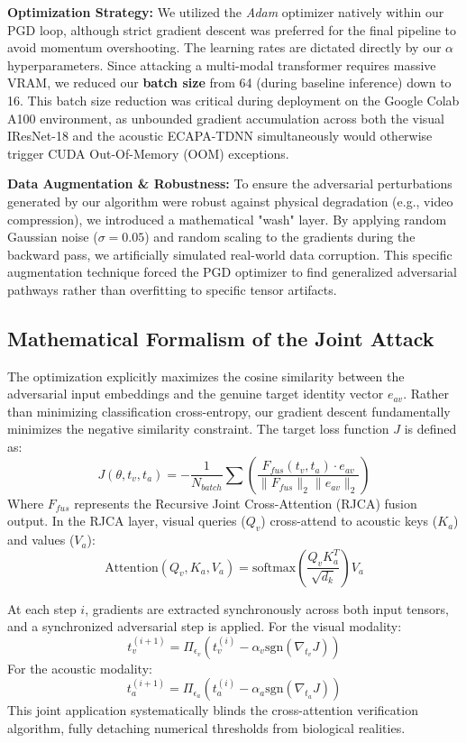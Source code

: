 \documentclass[conference]{IEEEtran}
\begin{document}
\textbf{Optimization Strategy:} We utilized the \textit{Adam} optimizer natively within our PGD loop, although strict gradient descent was preferred for the final pipeline to avoid momentum overshooting. The learning rates are dictated directly by our $\alpha$ hyperparameters. Since attacking a multi-modal transformer requires massive VRAM, we reduced our \textbf{batch size} from 64 (during baseline inference) down to 16. This batch size reduction was critical during deployment on the Google Colab A100 environment, as unbounded gradient accumulation across both the visual IResNet-18 and the acoustic ECAPA-TDNN simultaneously would otherwise trigger CUDA Out-Of-Memory (OOM) exceptions.

\textbf{Data Augmentation \& Robustness:} To ensure the adversarial perturbations generated by our algorithm were robust against physical degradation (e.g., video compression), we introduced a mathematical "wash" layer. By applying random Gaussian noise ($\sigma = 0.05$) and random scaling to the gradients during the backward pass, we artificially simulated real-world data corruption. This specific augmentation technique forced the PGD optimizer to find generalized adversarial pathways rather than overfitting to specific tensor artifacts.

\subsection{Mathematical Formalism of the Joint Attack}
The optimization explicitly maximizes the cosine similarity between the adversarial input embeddings and the genuine target identity vector $e_{av}$. Rather than minimizing classification cross-entropy, our gradient descent fundamentally minimizes the negative similarity constraint. The target loss function $J$ is defined as:
\begin{equation}
    J(\theta, t_v, t_a) = - \frac{1}{N_{batch}} \sum \left( \frac{F_{fus}(t_v, t_a) \cdot e_{av}}{\| F_{fus} \|_2 \| e_{av} \|_2} \right)
\end{equation}
Where $F_{fus}$ represents the Recursive Joint Cross-Attention (RJCA) fusion output. In the RJCA layer, visual queries ($Q_v$) cross-attend to acoustic keys ($K_a$) and values ($V_a$):
\begin{equation}
    \text{Attention}(Q_v, K_a, V_a) = \text{softmax}\left(\frac{Q_v K_a^T}{\sqrt{d_k}}\right)V_a
\end{equation}

At each step $i$, gradients are extracted synchronously across both input tensors, and a synchronized adversarial step is applied. For the visual modality:
\begin{equation}
    t_v^{(i+1)} = \Pi_{\epsilon_v}\left( t_v^{(i)} - \alpha_v \text{sgn}\left(\nabla_{t_v} J\right) \right)
\end{equation}
For the acoustic modality:
\begin{equation}
    t_a^{(i+1)} = \Pi_{\epsilon_a}\left( t_a^{(i)} - \alpha_a \text{sgn}\left(\nabla_{t_a} J\right) \right)
\end{equation}
This joint application systematically blinds the cross-attention verification algorithm, fully detaching numerical thresholds from biological realities.
\end{document}
